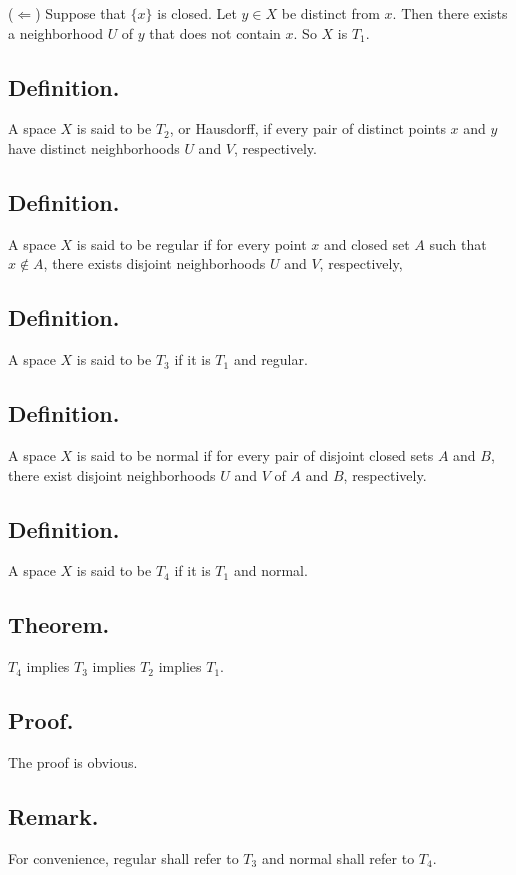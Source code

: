 \documentclass[titlepage]{article}
\begin{document}
($\Leftarrow$) Suppose that $\{x\}$ is closed. Let $y \in X$ be distinct from $x$. Then there exists a neighborhood $U$ of $y$ that does not contain $x$. So $X$ is $T_{1}$.

\subsection{Definition.} A space $X$ is said to be $T_{2}$, or Hausdorff, if every pair of distinct points $x$ and $y$ have distinct neighborhoods $U$ and $V$, respectively.

\subsection{Definition.} A space $X$ is said to be regular if for every point $x$ and closed set $A$ such that $x \notin A$, there exists disjoint neighborhoods $U$ and $V$, respectively,

\subsection{Definition.} A space $X$ is said to be $T_{3}$ if it is $T_{1}$ and regular.

\subsection{Definition.} A space $X$ is said to be normal if for every pair of disjoint closed sets $A$ and $B$, there exist disjoint neighborhoods $U$ and $V$ of $A$ and $B$, respectively.

\subsection{Definition.} A space $X$ is said to be $T_{4}$ if it is $T_{1}$ and normal.

\subsection{Theorem.} $T_{4}$ implies $T_{3}$ implies $T_{2}$ implies $T_{1}$.

\subsection{Proof.} The proof is obvious.

\subsection{Remark.} For convenience, regular shall refer to $T_{3}$ and normal shall refer to $T_{4}$.
\end{document}
